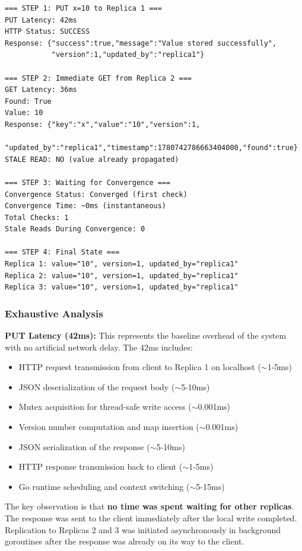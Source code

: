 \documentclass[10pt,a4paper]{article}
\begin{document}
\begin{verbatim}
=== STEP 1: PUT x=10 to Replica 1 ===
PUT Latency: 42ms
HTTP Status: SUCCESS
Response: {"success":true,"message":"Value stored successfully",
           "version":1,"updated_by":"replica1"}

=== STEP 2: Immediate GET from Replica 2 ===
GET Latency: 36ms
Found: True
Value: 10
Response: {"key":"x","value":"10","version":1,
           "updated_by":"replica1","timestamp":1780742786663404000,"found":true}
STALE READ: NO (value already propagated)

=== STEP 3: Waiting for Convergence ===
Convergence Status: Converged (first check)
Convergence Time: ~0ms (instantaneous)
Total Checks: 1
Stale Reads During Convergence: 0

=== STEP 4: Final State ===
Replica 1: value="10", version=1, updated_by="replica1"
Replica 2: value="10", version=1, updated_by="replica1"
Replica 3: value="10", version=1, updated_by="replica1"
\end{verbatim}

\subsubsection{Exhaustive Analysis}

\textbf{PUT Latency (42ms):} This represents the baseline overhead of the system with no artificial network delay. The 42ms includes:
\begin{itemize}
    \item HTTP request transmission from client to Replica 1 on localhost ($\sim$1-5ms)
    \item JSON deserialization of the request body ($\sim$5-10ms)
    \item Mutex acquisition for thread-safe write access ($\sim$0.001ms)
    \item Version number computation and map insertion ($\sim$0.001ms)
    \item JSON serialization of the response ($\sim$5-10ms)
    \item HTTP response transmission back to client ($\sim$1-5ms)
    \item Go runtime scheduling and context switching ($\sim$5-15ms)
\end{itemize}

The key observation is that \textbf{no time was spent waiting for other replicas}. The response was sent to the client immediately after the local write completed. Replication to Replicas 2 and 3 was initiated asynchronously in background goroutines after the response was already on its way to the client.
\end{document}
